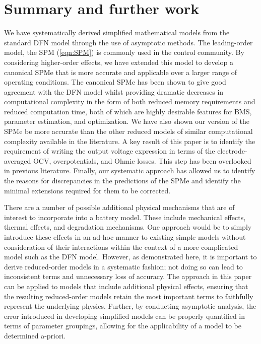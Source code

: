 \documentclass[a4paper]{article}
\begin{document}
\section{Summary and further work} 
We have systematically derived simplified mathematical models from the standard DFN model through the use of asymptotic methods. The leading-order model, the SPM (\ref{eqn:SPM}) is commonly used in the control community. By considering higher-order effects, we have extended this model to develop a canonical SPMe that is more accurate and applicable over a larger range of operating conditions. The canonical SPMe has been shown to give good agreement with the DFN model whilst providing dramatic decreases in computational complexity in the form of both reduced memory requirements and reduced computation time, both of which are highly desirable features for BMS, parameter estimation, and optimization. We have also shown our version of the SPMe be more accurate than the other reduced models of similar computational complexity available in the literature. A key result of this paper is to identify the requirement of writing the output voltage expression in terms of the electrode-averaged OCV, overpotentials, and Ohmic losses. This step has been overlooked in previous literature. Finally, our systematic approach has allowed us to identify the reasons for discrepancies in the predictions of the SPMe and identify the minimal extensions required for them to be corrected.  

There are a number of possible additional physical mechanisms that are of interest to incorporate into a battery model. These include mechanical effects, thermal effects, and degradation mechanisms. One approach would be to simply introduce these effects in an ad-hoc manner to existing simple models without consideration of their interactions within the context of a more complicated model such as the DFN model. However, as demonstrated here, it is important to derive reduced-order models in a systematic fashion; not doing so can lead to inconsistent terms and unnecessary loss of accuracy. The approach in this paper can be applied to models that include additional physical effects, ensuring that the resulting reduced-order models retain the most important terms to faithfully represent the underlying physics. Further, by conducting asymptotic analysis, the error introduced in developing simplified models can be properly quantified in terms of parameter groupings, allowing for the applicability of a model to be determined a-priori.
\end{document}
